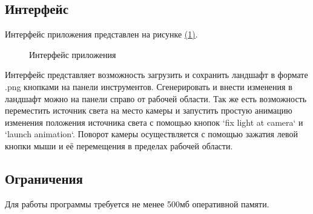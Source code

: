 \documentclass{article}
\begin{document}
	\subsection{Интерфейс}
	\indent Интерфейс приложения представлен на рисунке \hyperref[interfaceApp]{(\ref{interfaceApp})}.
	\begin{figure}[H]
		 \caption{Интерфейс приложения}
		 \label{interfaceApp}
	 \end{figure}
	Интерфейс представляет возможность загрузить и сохранить ландшафт в формате .png кнопками на панели инструментов. Сгенерировать и внести изменения в ландшафт можно на панели справо от рабочей области. Так же есть возможность переместить источник света на место камеры и запустить простую анимацию изменения положения источника света с помощью кнопок `fix light at camera` и `launch animation`. Поворот камеры осуществляется с помощью зажатия левой кнопки мыши и её перемещения в пределах рабочей области.
	\subsection{Ограничения}
	\indent Для работы программы требуется не менее 500мб оперативной памяти.
\end{document}
